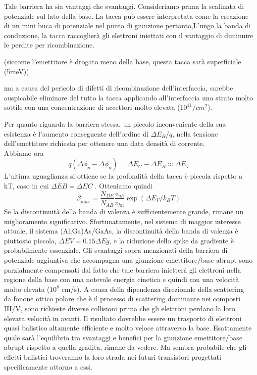 Tale barriera ha sia vantaggi che svantaggi.
Consideriamo prima la scalinata di potenziale sul lato della base. 
La tacca può essere interpretata come la creazione di un mini buca di potenziale nel punto di giunzione pertanto,L'ungo la banda di conduzione, la tacca raccoglierà gli elettroni iniettati con il vantaggio di  diminuire le perdite per ricombinazione.

(siccome l'emettitore è drogato meno della base, questa tacca sarà superficiale (5meV))

ma a causa del pericolo di difetti di ricombinazione dell'interfaccia, sarebbe auspicabile eliminare del tutto la tacca applicando all'interfaccia uno strato molto sottile con una concentrazione di accettori molto elevata ($10^{11}/cm^2$). 

Per quanto riguarda la barriera stessa, un piccolo inconveniente della sua esistenza è l'aumento conseguente dell'ordine di $\Delta E_{B}/q$, nella tensione dell'emettitore richiesta per ottenere una data densità di corrente. \\
Abbiamo ora
\begin{equation}
    q(\Delta \phi_p -\Delta \phi_n)=\Delta E_G - \Delta E_B \approx \Delta E_V
\end{equation}
L'ultima uguaglianza si ottiene se la profondità della tacca è piccola rispetto a kT, caso in cui $\Delta EB = \Delta EC$ . Otteniamo quindi
\begin{equation}
    \beta_{max}=\dfrac{N_{DE}}{N_{AB}}\dfrac{v_{nh}}{v_{hn}}\exp(\Delta E_V/k_BT)
\end{equation}
Se la discontinuità della banda di valenza è sufficientemente grande, rimane un miglioramento significativo. Sfortunatamente, nel sistema di maggior interesse attuale, il sistema (Al,Ga)As/GaAs, la discontinuità della banda di valenza è piuttosto piccola, $\Delta EV = 0.15 \Delta Eg$, e la riduzione dello spike da gradiente è probabilmente essenziale.
Gli svantaggi sopra menzionati della barriera di potenziale aggiuntiva che accompagna una giunzione emettitore/base abrupt sono parzialmente compensati dal fatto che tale barriera inietterà gli elettroni nella regione della base con una notevole energia cinetica e quindi con una velocità molto elevata ($10^8$ cm/s). A causa della dipendenza direzionale della scattering da fonone ottico polare che è il processo di scattering dominante nei composti III/V, sono richieste diverse collisioni prima che gli elettroni perdano la loro elevata velocità in avanti. Il risultato dovrebbe essere un trasporto di elettroni quasi balistico altamente efficiente e molto veloce attraverso la base. Esattamente quale sarà l'equilibrio tra svantaggi e benefici per la giunzione emettitore/base abrupt rispetto a quella gradita, rimane da vedere. Ma sembra probabile che gli effetti balistici troveranno la loro strada nei futuri transistori progettati specificamente attorno a essi.\\
